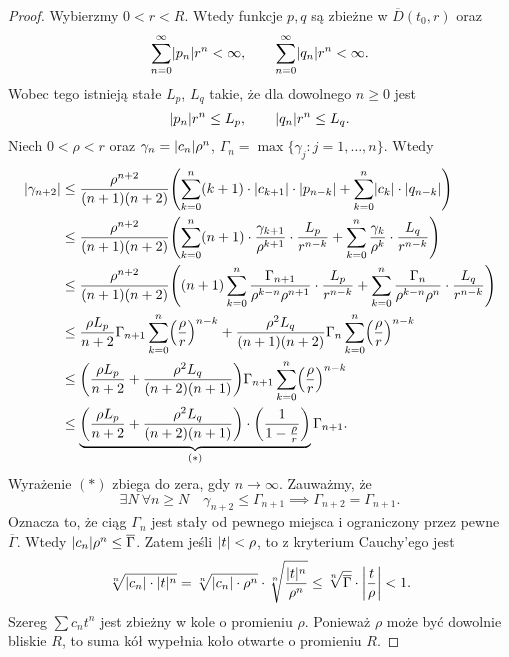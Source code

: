\begin{proof}
  Wybierzmy $0 < r < R$. Wtedy funkcje $p,q$ są zbieżne w $\overline{D} (t_0,r)$ oraz
  \begin{equation*}
    \sum_{n=0}^{\infty} \abs{p_n} r^n < \infty, \qquad \sum_{n=0}^{\infty} \abs{q_n} r^n < \infty.
  \end{equation*}
  Wobec tego istnieją stałe $L_p$, $L_q$ takie, że dla dowolnego $n \geq 0$ jest
  \begin{equation*}
    \abs{p_n} r^n \leq L_p, \qquad \abs{q_n} r^n \leq L_q.
  \end{equation*}
  Niech $0 < \rho < r$ oraz $\gamma_n = \abs{c_n} \rho^n$, $\Gamma_n = \max\{\gamma_j: j = 1,\ldots,n\}$. Wtedy
  \begin{align*}
    \abs{\gamma_{n+2}}
    &\leq \frac{\rho^{n+2}}{(n+1)(n+2)} \p*{ \sum_{k = 0}^{n} (k + 1) \cdot \abs{c_{k + 1}} \cdot \abs{p_{n - k}} + 
        \sum_{k = 0}^{n} \abs{c_k} \cdot \abs{q_{n - k}}} \\ 
    &\leq \frac{\rho^{n+2}}{(n+1)(n+2)} \p*{ \sum_{k=0}^{n} (n+1) \cdot \frac{\gamma_{k+1}}{\rho^{k+1}} 
        \cdot \frac{L_p}{r^{n-k}} + \sum_{k=0}^{n} \frac{\gamma_k}{\rho^k} \cdot \frac{L_q}{r^{n-k}} } \\ 
    &\leq \frac{\rho^{n+2}}{(n+1)(n+2)} \p*{ (n+1) \sum_{k=0}^{n} \frac{\Gamma_{n+1}}{\rho^{k-n} \rho^{n+1}} \cdot 
        \frac{L_p}{r^{n-k}} + \sum_{k=0}^{n} \frac{\Gamma_n}{\rho^{k-n}\rho^{n}} \cdot \frac{L_q}{r^{n-k}} } \\
    &\leq \frac{\rho L_p}{n+2} \Gamma_{n+1} \sum_{k=0}^{n} \p*{ \frac{\rho}{r} }^{n-k} +
        \frac{\rho^2 L_q}{(n+1)(n+2)} \Gamma_n \sum_{k=0}^{n} \p*{ \frac{\rho}{r} }^{n-k} \\
    &\leq \p*{ \frac{\rho L_p}{n+2} + \frac{\rho^2 L_q}{(n+2)(n+1)}} \Gamma_{n+1}
        \sum_{k=0}^n \p*{ \frac{\rho}{r} }^{n-k} \\
    &\leq \underbrace{\p*{ \frac{\rho L_p}{n+2} + \frac{\rho^2 L_q}{(n+2)(n+1)}} \cdot
        \p*{\frac{1}{1 - \frac{\rho}{r}}}}_{(\ast)} \Gamma_{n+1}.
  \end{align*}
  Wyrażenie $(\ast)$ zbiega do zera, gdy $n \to \infty$. Zauważmy, że
  \begin{equation*}
    \exists N \ \forall n \geq N \quad \gamma_{n+2} \leq \Gamma_{n+1} \implies \Gamma_{n+2} = 
    \Gamma_{n+1}.
  \end{equation*}
  Oznacza to, że ciąg $\Gamma_n$ jest stały od pewnego miejsca i ograniczony przez 
  pewne~$\overline{\Gamma}$. Wtedy $\abs{c_n}\rho^n \leq \overline{\Gamma}$. Zatem jeśli $\abs{t} < 
  \rho$, to z kryterium Cauchy'ego jest
  \begin{equation*}
    \sqrt[n]{\abs{c_n} \cdot \abs{t}^n} = \sqrt[n]{\abs{c_n} \cdot \rho^n} \cdot 
    \sqrt[n]{\frac{\abs{t}^n}{\rho^n}} \leq \sqrt[n]{\overline{\Gamma}} \cdot \abs*{\frac{t}{\rho}} 
    < 1.
  \end{equation*}
  Szereg $\sum c_n t^n$ jest zbieżny w kole o promieniu $\rho$. Ponieważ $\rho$ może być dowolnie 
  bliskie $R$, to suma kół wypełnia koło otwarte o promieniu $R$.
\end{proof}
